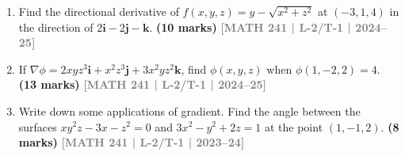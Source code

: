 \documentclass[12pt,a4paper]{article}
\newcommand{\yr}[1]{\hfill\textcolor{gray}{\small\textbf{[#1]}}}
\newcommand{\mk}[1]{\textcolor{orange!70!black}{\small\textbf{(#1 marks)}}}
\begin{document}
\begin{enumerate}
\begin{tcolorbox}[enhanced,breakable,ansbox,colback=cD!4,colframe=cD,boxrule=0.8pt,arc=5pt,title={\textbf{Answer}},fonttitle=\bfseries\color{white},colbacktitle=cD]
The standard equation of a tangent plane to a surface at the point $(x_0, y_0, z_0)$ is given by:
\[ F_x(P_0)(x - x_0) + F_y(P_0)(y - y_0) + F_z(P_0)(z - z_0) = 0 \]

Substituting $P_0(2, -1, 1)$ and the calculated partial derivatives:
\begin{align*}
    1(x - 2) + 0(y - (-1)) + 3(z - 1) &= 0 \\
    x - 2 + 3z - 3 &= 0 \\
    x + 3z - 5 &= 0
\end{align*}

Therefore, the equation of the tangent plane is:
\[ \boxed{x + 3z = 5} \]

\vspace{1em}
\textbf{3. Equation of the Normal Line}

The normal line passes through $(x_0, y_0, z_0)$ and is parallel to the normal vector $\mathbf{n} = (F_x, F_y, F_z)$.

\begin{itemize}
    \item \textbf{Parametric Form:}
    \begin{align*}
        x &= x_0 + F_x(P_0)t = 2 + t \\
        y &= y_0 + F_y(P_0)t = -1 \\
        z &= z_0 + F_z(P_0)t = 1 + 3t
    \end{align*}

    \item \textbf{Symmetric Form:}
    Since the $y$-component of the normal vector is zero ($F_y = 0$), the coordinate $y$ remains constantly equal to $-1$, and we write the symmetric equations as:
    \[ \boxed{\frac{x - 2}{1} = \frac{z - 1}{3}, \quad y = -1} \]
\end{itemize}

\end{tcolorbox}

\item Find the directional derivative of $f(x,y,z)=y-\sqrt{x^{2}+z^{2}}$ at $(-3,1,4)$ in the direction of $2\mathbf{i}-2\mathbf{j}-\mathbf{k}$.
\mk{10} \yr{MATH 241 | L-2/T-1 | 2024--25}

\item If $\nabla\phi=2xyz^{3}\mathbf{i}+x^{2}z^{3}\mathbf{j}+3x^{2}yz^{2}\mathbf{k}$, find $\phi(x,y,z)$ when $\phi(1,-2,2)=4$.
\mk{13} \yr{MATH 241 | L-2/T-1 | 2024--25}

\item Write down some applications of gradient. Find the angle between the surfaces $xy^{2}z-3x-z^{2}=0$ and $3x^{2}-y^{2}+2z=1$ at the point $(1,-1,2)$.
\mk{8} \yr{MATH 241 | L-2/T-1 | 2023--24}


\end{enumerate}
\end{document}
